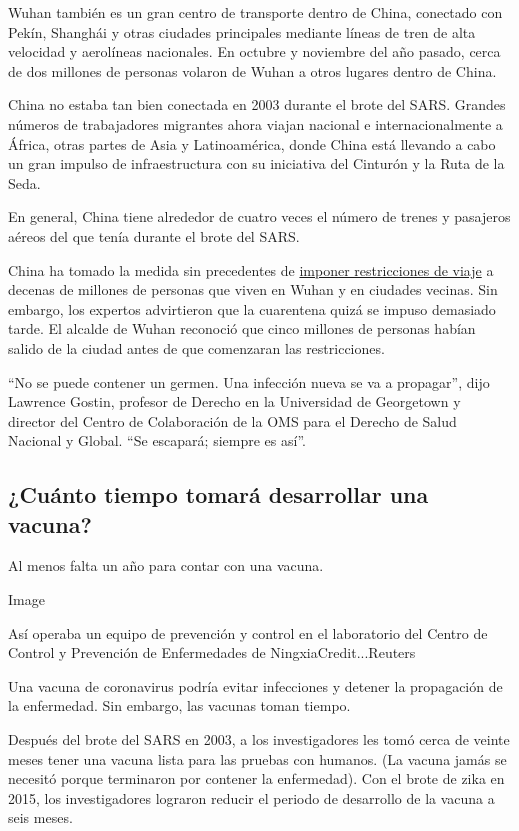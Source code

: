 Wuhan también es un gran centro de transporte dentro de China, conectado
con Pekín, Shanghái y otras ciudades principales mediante líneas de tren
de alta velocidad y aerolíneas nacionales. En octubre y noviembre del
año pasado, cerca de dos millones de personas volaron de Wuhan a otros
lugares dentro de China.

China no estaba tan bien conectada en 2003 durante el brote del SARS.
Grandes números de trabajadores migrantes ahora viajan nacional e
internacionalmente a África, otras partes de Asia y Latinoamérica, donde
China está llevando a cabo un gran impulso de infraestructura con su
iniciativa del Cinturón y la Ruta de la Seda.

En general, China tiene alrededor de cuatro veces el número de trenes y
pasajeros aéreos del que tenía durante el brote del SARS.

China ha tomado la medida sin precedentes de
\href{https://www.nytimes.com/2020/01/26/world/asia/coronavirus-wuhan-china-hubei.html}{imponer
restricciones de viaje} a decenas de millones de personas que viven en
Wuhan y en ciudades vecinas. Sin embargo, los expertos advirtieron que
la cuarentena quizá se impuso demasiado tarde. El alcalde de Wuhan
reconoció que cinco millones de personas habían salido de la ciudad
antes de que comenzaran las restricciones.

``No se puede contener un germen. Una infección nueva se va a
propagar'', dijo Lawrence Gostin, profesor de Derecho en la Universidad
de Georgetown y director del Centro de Colaboración de la OMS para el
Derecho de Salud Nacional y Global. ``Se escapará; siempre es así''.

\hypertarget{cuuxe1nto-tiempo-tomaruxe1-desarrollar-una-vacuna}{%
\subsection{¿Cuánto tiempo tomará desarrollar una
vacuna?}\label{cuuxe1nto-tiempo-tomaruxe1-desarrollar-una-vacuna}}

Al menos falta un año para contar con una vacuna.

Image

Así operaba un equipo de prevención y control en el laboratorio del
Centro de Control y Prevención de Enfermedades de
NingxiaCredit...Reuters

Una vacuna de coronavirus podría evitar infecciones y detener la
propagación de la enfermedad. Sin embargo, las vacunas toman tiempo.

Después del brote del SARS en 2003, a los investigadores les tomó cerca
de veinte meses tener una vacuna lista para las pruebas con humanos. (La
vacuna jamás se necesitó porque terminaron por contener la enfermedad).
Con el brote de zika en 2015, los investigadores lograron reducir el
periodo de desarrollo de la vacuna a seis meses.


